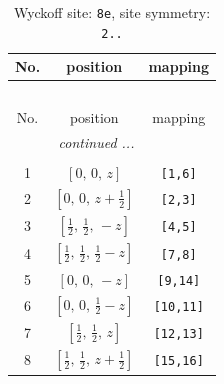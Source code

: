 \documentclass[fleqn,8pt]{jsarticle}
\begin{document}
\renewcommand{\arraystretch}{1.2}
\begin{longtable}{ccc}
\caption{Wyckoff site: {\tt 8e}, site symmetry: {\tt 2..}}
 \\
 \hline \hline
No. & position & mapping \\ \hline \endfirsthead

\multicolumn{2}{l}{\tablename\ \thetable{}} \\
 \hline \hline
No. & position & mapping \\ \hline \endhead

 \hline \hline
\multicolumn{2}{r}{\footnotesize\it continued ...} \\ \endfoot

 \hline \hline
\multicolumn{2}{r}{} \\ \endlastfoot

1 & $\left[ 0,\, 0,\, z \right]$ & {\tt [1,6]} \\ \hline
2 & $\left[ 0,\, 0,\, z + \frac{1}{2} \right]$ & {\tt [2,3]} \\ \hline
3 & $\left[ \frac{1}{2},\, \frac{1}{2},\, - z \right]$ & {\tt [4,5]} \\ \hline
4 & $\left[ \frac{1}{2},\, \frac{1}{2},\, \frac{1}{2} - z \right]$ & {\tt [7,8]} \\ \hline
5 & $\left[ 0,\, 0,\, - z \right]$ & {\tt [9,14]} \\ \hline
6 & $\left[ 0,\, 0,\, \frac{1}{2} - z \right]$ & {\tt [10,11]} \\ \hline
7 & $\left[ \frac{1}{2},\, \frac{1}{2},\, z \right]$ & {\tt [12,13]} \\ \hline
8 & $\left[ \frac{1}{2},\, \frac{1}{2},\, z + \frac{1}{2} \right]$ & {\tt [15,16]} \\
\end{longtable}
\renewcommand{\arraystretch}{1.2}
\end{document}
